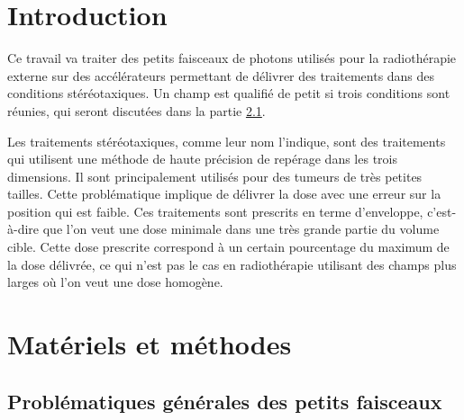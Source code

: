 \documentclass{article}
\begin{document}




\onehalfspacing

\pagestyle{fancy}
	\renewcommand\headrulewidth{0.5pt}
	\renewcommand\footrulewidth{0.5pt}
	\fancyfoot[R]{\thepage}

\tableofcontents
\clearpage
\section{Introduction}

Ce travail va traiter des petits faisceaux de photons utilisés pour la radiothérapie externe sur des accélérateurs permettant de délivrer des traitements dans des conditions stéréotaxiques. Un champ est qualifié de petit si trois conditions sont réunies, qui seront discutées dans la partie \ref*{partie_problematiques}.

Les traitements stéréotaxiques, comme leur nom l'indique, sont des traitements qui utilisent une méthode de haute précision de repérage dans les trois dimensions. Il sont principalement utilisés pour des tumeurs de très petites tailles. Cette problématique implique de délivrer la dose avec une erreur sur la position qui est faible. Ces traitements sont prescrits en terme d'enveloppe, c'est-à-dire que l'on veut une dose minimale dans une très grande partie du volume cible. Cette dose prescrite correspond à un certain pourcentage du maximum de la dose délivrée, ce qui n'est pas le cas en radiothérapie utilisant des champs plus larges où l'on veut une dose homogène.



\section{Matériels et méthodes}
\subsection{Problématiques générales des petits faisceaux}
\label{partie_problematiques}
\end{document}
